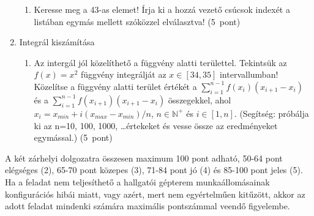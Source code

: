 \documentclass[a4paper,12pt]{letter}
\begin{document}
\begin{enumerate}
\begin{enumerate}
    \item Keresse meg a 43-as elemet! Írja ki a hozzá vezető csúcsok indexét a listában egymás mellett szóközzel elválasztva! \hfill (5~pont)
    \end{enumerate}
  \item Integrál kiszámítása
    \begin{enumerate}
    \item Az intergál jól közelíthető a függvény alatti területtel. Tekintsük az $f\left(x\right)=x^{2}$ függvény integrálját az $x \in \left[34,35\right]$ intervallumban! Közelítse a függvény alatti terület értékét a $\sum_{i=1}^{n-1}f\left(x_{i}\right)\left(x_{i+1}-x_{i}\right)$ és a $\sum_{i=1}^{n-1}f\left(x_{i+1}\right)\left(x_{i+1}-x_{i}\right)$ összegekkel, ahol $x_{i}=x_{min}+i \left(x_{max}-x_{min}\right)/n$, $n\in\mathbb{N}^{+}$ és $i \in \left[1,n\right]$. (Segítség: próbálja ki az n=10, 100, 1000, \dots értekeket és vesse össze az eredményeket egymással.) \hfill (5~pont)
    \end{enumerate}
    \end{enumerate}

A két zárhelyi dolgozatra összesen maximum 100 pont adható, 50-64 pont elégséges (2), 65-70 pont közepes (3), 71-84 pont jó (4) és 85-100 pont jeles (5). Ha a feladat nem teljesíthető a hallgatói gépterem munkaállomásainak konfigurációs hibái miatt, vagy azért, mert nem egyértelműen kitűzött, akkor az adott feladat mindenki számára maximális pontszámmal veendő figyelembe.

\bigskip


\vfill
\end{document}
